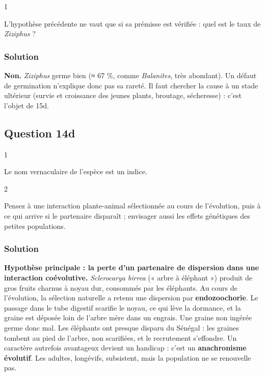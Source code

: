 \documentclass[11pt,a4paper]{article}
\begin{document}
\begin{indication}{1}

L'hypothèse précédente ne vaut que si sa prémisse est vérifiée : quel est le taux de \emph{Ziziphus} ?

\end{indication}

\hypertarget{solution-39}{%
\subsubsection{Solution}\label{solution-39}}

\textbf{Non.} \emph{Ziziphus} germe bien (≈ 67 \%, comme \emph{Balanites}, très abondant). Un défaut de germination n'explique donc pas sa rareté. Il faut chercher la cause à un stade ultérieur (survie et croissance des jeunes plants, broutage, sécheresse) : c'est l'objet de 15d.

\hypertarget{question-14d}{%
\subsection{Question 14d}\label{question-14d}}

\begin{indication}{1}

Le nom vernaculaire de l'espèce est un indice.

\end{indication}

\begin{indication}{2}

Pensez à une interaction plante-animal sélectionnée au cours de l'évolution, puis à ce qui arrive si le partenaire disparaît ; envisager aussi les effets génétiques des petites populations.

\end{indication}

\hypertarget{solution-40}{%
\subsubsection{Solution}\label{solution-40}}

\textbf{Hypothèse principale : la perte d'un partenaire de dispersion dans une interaction coévolutive.} \emph{Sclerocarya birrea} (« arbre à éléphant ») produit de gros fruits charnus à noyau dur, consommés par les éléphants. Au cours de l'évolution, la sélection naturelle a retenu une dispersion par \textbf{endozoochorie}. Le passage dans le tube digestif scarifie le noyau, ce qui lève la dormance, et la graine est déposée loin de l'arbre mère dans un engrais. Une graine non ingérée germe donc mal. Les éléphants ont presque disparu du Sénégal : les graines tombent au pied de l'arbre, non scarifiées, et le recrutement s'effondre. Un caractère autrefois avantageux devient un handicap : c'est un \textbf{anachronisme évolutif}. Les adultes, longévifs, subsistent, mais la population ne se renouvelle pas.
\end{document}
